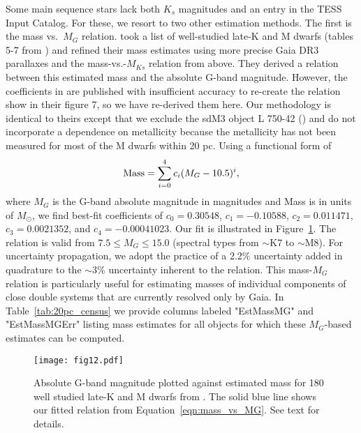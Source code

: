 \documentclass[twocolumn,tighten,twocolappendix]{aastex631}
\begin{document}
Some main sequence stars lack both $K_s$ magnitudes and an entry in the TESS Input Catalog. For these, we resort to two other estimation methods. The first is the mass vs.\ $M_G$ relation. \cite{chontos2021} took a list of well-studied late-K and M dwarfs (tables 5-7 from \citealt{mann2015}) and refined their mass estimates using more precise Gaia DR3 parallaxes and the \cite{mann2019} mass-vs.-$M_{Ks}$ relation from above. They derived a relation between this estimated mass and the absolute G-band magnitude. However, the coefficients in \cite{chontos2021} are published with insufficient accuracy to re-create the relation show in their figure 7, so we have re-derived them here. Our methodology is identical to theirs except that we exclude the sdM3 object L 750-42 (\citealt{gizis1997}) and do not incorporate a dependence on metallicity because the metallicity has not been measured for most of the M dwarfs within 20 pc. Using a functional form of 
\begin{equation}
    {\rm Mass} = \sum_{i=0}^{4}c_i(M_G-10.5)^i,
    \label{eqn:mass_vs_MG}
\end{equation} 
where $M_G$ is the G-band absolute magnitude in magnitudes and Mass is in units of $M_\odot$, we find best-fit coefficients of $c_0 = 0.30548$, $c_1 = -0.10588$, $c_2 = 0.011471$, $c_3 = 0.0021352$, and $c_4 = -0.00041023$. Our fit is illustrated in Figure~\ref{fig:mass_vs_MG}. The relation is valid from $7.5 \le M_G \le 15.0$ (spectral types from $\sim$K7 to $\sim$M8). For uncertainty propagation, we adopt the \cite{chontos2021} practice of a 2.2\% uncertainty added in quadrature to the $\sim$3\% uncertainty inherent to the \cite{mann2019} relation. This mass-$M_G$ relation is particularly useful for estimating masses of individual components of close double systems that are currently resolved only by Gaia. In Table~\ref{tab:20pc_census} we provide columns labeled "EstMassMG" and "EstMassMGErr" listing mass estimates for all objects for which these $M_G$-based estimates can be computed.

\begin{figure}
\texttt{[image: fig12.pdf]}
\caption{Absolute G-band magnitude plotted against estimated mass for 180 well studied late-K and M dwarfs from \cite{mann2015}. The solid blue line shows our fitted relation from Equation~\ref{eqn:mass_vs_MG}. See text for details.
\label{fig:mass_vs_MG}}
\end{figure}
\end{document}
